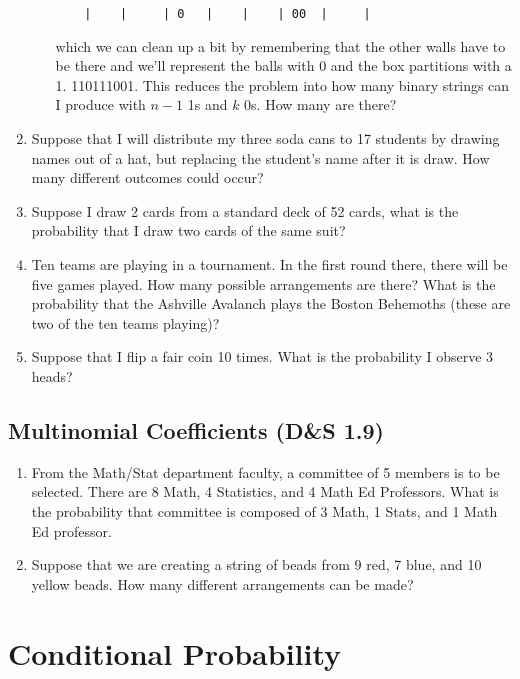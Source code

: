 \documentclass[]{book}
\begin{document}
\begin{enumerate}
\begin{enumerate}
\begin{verbatim}
    |    |     | 0   |    |    | 00  |     |
\end{verbatim}

    which we can clean up a bit by remembering that the other walls have
    to be there and we'll represent the balls with 0 and the box
    partitions with a 1.
    \textbf{\textbar{}}110111001\textbf{\textbar{}}. This reduces the
    problem into how many binary strings can I produce with \(n-1\) 1s
    and \(k\) 0s. How many are there?
  \end{enumerate}
\item
  Suppose that I will distribute my three soda cans to 17 students by
  drawing names out of a hat, but replacing the student's name after it
  is draw. How many different outcomes could occur?
\item
  Suppose I draw 2 cards from a standard deck of 52 cards, what is the
  probability that I draw two cards of the same suit?
\item
  Ten teams are playing in a tournament. In the first round there, there
  will be five games played. How many possible arrangements are there?
  What is the probability that the Ashville Avalanch plays the Boston
  Behemoths (these are two of the ten teams playing)?
\item
  Suppose that I flip a fair coin 10 times. What is the probability I
  observe 3 heads?
\end{enumerate}

\section{Multinomial Coefficients (D\&S
1.9)}\label{multinomial-coefficients-ds-1.9}

\begin{enumerate}
\def\labelenumi{\arabic{enumi}.}
\item
  From the Math/Stat department faculty, a committee of 5 members is to
  be selected. There are 8 Math, 4 Statistics, and 4 Math Ed Professors.
  What is the probability that committee is composed of 3 Math, 1 Stats,
  and 1 Math Ed professor.
\item
  Suppose that we are creating a string of beads from 9 red, 7 blue, and
  10 yellow beads. How many different arrangements can be made?
\end{enumerate}

\chapter{Conditional Probability}\label{conditional-probability}
\end{document}
